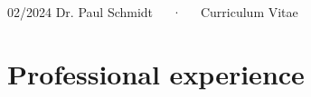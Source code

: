 \documentclass[11pt,a4paper,]{awesome-cv}
\begin{document}
\makecvheader

\makecvfooter
  {02/2024}
    {Dr. Paul Schmidt~~~·~~~Curriculum Vitae}
  {\thepage}






\hypertarget{professional-experience}{%
\section{Professional experience}\label{professional-experience}}
\end{document}
